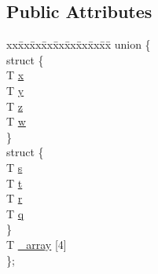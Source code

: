 \subsection*{Public Attributes}
\begin{CompactItemize}
\item 
\begin{tabbing}
xx\=xx\=xx\=xx\=xx\=xx\=xx\=xx\=xx\=\kill
union \{\\
\>struct \{\\
\>\>T \hyperlink{classnv_1_1vec4_ebca1c5ded6f9fc33a18c6c445788ae0}{x}\\
\>\>T \hyperlink{classnv_1_1vec4_84d82fa7546ebcecdeee30e455faace8}{y}\\
\>\>T \hyperlink{classnv_1_1vec4_6dd15318e5ada1377b6910db6e592999}{z}\\
\>\>T \hyperlink{classnv_1_1vec4_3f951f25ac6af5c0ea919e52f572f834}{w}\\
\>\} \\
\>struct \{\\
\>\>T \hyperlink{classnv_1_1vec4_63a10222748073bb3824bf8e3938a956}{s}\\
\>\>T \hyperlink{classnv_1_1vec4_89a4682a6fae5210e042020eae36c6a1}{t}\\
\>\>T \hyperlink{classnv_1_1vec4_cce02b228d7245e9bf9ab0a8a94e842a}{r}\\
\>\>T \hyperlink{classnv_1_1vec4_f4f30562ea083784e6c95c3564c70d88}{q}\\
\>\} \\
\>T \hyperlink{classnv_1_1vec4_2f9eb49f9af13e0b49d6ec80f54d4c02}{\_array} \mbox{[}4\mbox{]}\\
\}; \\

\end{tabbing}\end{CompactItemize}
